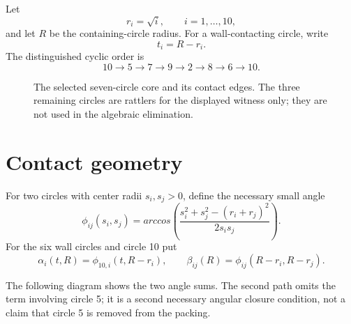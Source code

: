 \documentclass[11pt,a4paper]{article}
\begin{document}
Let
\[
 r_i=\sqrt{i},\qquad i=1,\ldots,10,
\]
and let $R$ be the containing-circle radius.  For a wall-contacting circle,
write
\[
 t_i=R-r_i.
\]
The distinguished cyclic order is
\[
 10\longrightarrow5\longrightarrow7\longrightarrow9
 \longrightarrow2\longrightarrow8\longrightarrow6\longrightarrow10.
\]

\begin{figure}[ht]
\centering
{}
\caption{The selected seven-circle core and its contact edges. The three
remaining circles are rattlers for the displayed witness only; they are not
used in the algebraic elimination.}
\label{fig:contact}
\end{figure}

\section{Contact geometry}

For two circles with center radii $s_i,s_j>0$, define the necessary small
angle
\[
 \phi_{ij}(s_i,s_j)=arccos\left(
 \frac{s_i^2+s_j^2-(r_i+r_j)^2}{2s_is_j}\right).
\]
For the six wall circles and circle 10 put
\[
 \alpha_i(t,R)=\phi_{10,i}(t,R-r_i),
 \qquad
 \beta_{ij}(R)=\phi_{ij}(R-r_i,R-r_j).
\]

The following diagram shows the two angle sums.  The second path omits the
term involving circle 5; it is a second necessary angular closure condition,
not a claim that circle 5 is removed from the packing.
\end{document}
